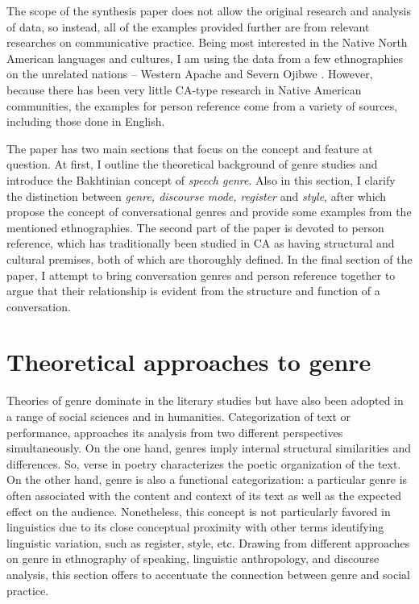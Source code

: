 \documentclass[12pt, draft]{article}
\begin{document}
The scope of the synthesis paper does not allow the original research and analysis of data, so instead, all of the examples provided further are from relevant researches on communicative practice. Being most interested in the Native North American languages and cultures, I am using the data from a few ethnographies on the unrelated nations -- Western Apache \parencite{basso1996, basso1990, samuels2004} and Severn Ojibwe \parencite{valentine1995}. However, because there has been very little CA-type research in Native American communities, the examples for person reference come from a variety of sources, including those done in English. 

The paper has two main sections that focus on the concept and feature at question. At first, I  outline the theoretical background of genre studies and introduce the Bakhtinian concept of \textit{speech genre}. Also in this section, I  clarify the distinction between \textit{genre, discourse mode, register} and \textit{style}, after which propose the concept of conversational genres and provide some examples from the mentioned ethnographies. The second part of the paper is devoted to person reference, which has traditionally been studied in CA as having structural and cultural premises, both of which are thoroughly defined. In the final section of the paper, I attempt to bring conversation genres and person reference together to argue that their relationship is evident from the structure and function of a conversation.
\section{Theoretical approaches to genre}
Theories of genre dominate in the literary studies but have also been adopted in a range of social sciences and in humanities. Categorization of text or performance, approaches its analysis from two different perspectives simultaneously. On the one hand, genres imply internal structural similarities and differences. So, verse in poetry characterizes the poetic organization of the text. On the other hand, genre is also a functional categorization: a particular genre is often associated with the content and context of its text as well as the expected effect on the audience. Nonetheless, this concept is not particularly favored in linguistics due to its close conceptual proximity with other terms identifying linguistic variation, such as register, style, etc. Drawing from different approaches on genre in ethnography of speaking, linguistic anthropology, and discourse analysis, this section offers to accentuate the connection between genre and social practice.
\end{document}
